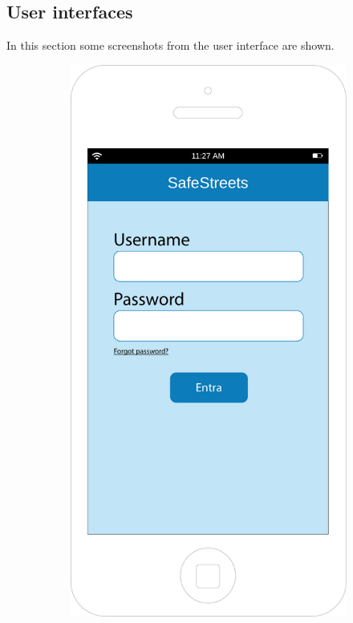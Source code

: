 \documentclass[12pt,a4paper]{report}
\begin{document}
		\subsection{User interfaces}
		In this section some screenshots from the user interface are shown. 
		\begin{figure}[h]
		\begin{subfigure}{0.5\textwidth}
			\includegraphics[scale=0.25, center]{Login}

\end{subfigure}
\end{figure}
\end{document}
